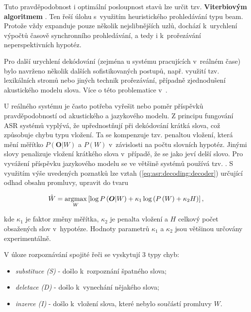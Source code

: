 \noindent Tuto pravděpodobnost i optimální posloupnost stavů lze určit tzv. \textbf{Viterbiovým algoritmem} \cite{Holmes2001}. Ten řeší úlohu s~využitím heuristického prohledávání typu beam. Protože vždy expanduje pouze několik nejslibnějších uzlů, dochází  k~urychlení výpočtů časově synchronního prohledávání, a tedy i  k~prořezávání neperspektivních hypotéz.

Pro další urychlení dekódování (zejména u systému pracujících v~reálném čase) bylo navrženo několik dalších sofistikovaných postupů, např. využití tzv. lexikálních stromů nebo jiných technik prořezávání, případně zjednodušení akustického modelu slova. Více o této problematice v~\cite{Psutka2006}.

U reálného systému je často potřeba vyřešit nebo  poměr příspěvků pravděpodobností od akustického a jazykového modelu. Z principu fungování ASR systémů vyplývá, že upřednostňují při dekódování krátká slova, což způsobuje chybu typu vložení. Ta se kompenzuje tzv. penaltou vložení, která mění měřítko $P(\boldsymbol{O}|W)$ a $P(W)$ v~závislosti na počtu slovních hypotéz. Jinými slovy penalizuje vložení krátkého slova v~případě, že se jako  jeví delší slovo. Pro vyvážení příspěvku jazykového modelu se ve většině systémů používá tzv. . S využitím výše uvedených poznatků lze vztah (\ref{eq:asr:decoding:decoder}) určující odhad obsahu promluvy, upravit do tvaru

\begin{equation}
  \hat{W} = \operatorname*{argmax}_{W} \left[\log P\left(\boldsymbol{O}|W\right) + \kappa_1 \log\left(P\left(W\right) + \kappa_2H\right)\right],
  \label{eq:asr:decoding:compensated}
\end{equation}

\noindent kde $\kappa_1$ je faktor změny měřítka, $\kappa_2$ je penalta vložení a $H$ celkový počet obsažených slov v~hypotéze. Hodnoty parametrů $\kappa_1$ a $\kappa_2$ jsou většinou určovány experimentálně.

V úloze rozpoznávání spojité řeči se vyskytují 3 typy chyb:

\begin{itemize}
  \item \textit{substituce (S)} - došlo  k~rozpoznání špatného slova;
  \item \textit{deletace (D)} - došlo  k~vynechání nějakého slova;
  \item \textit{inzerce (I)} - došlo  k~vložení slova, které nebylo součástí promluvy $W$.
\end{itemize}

